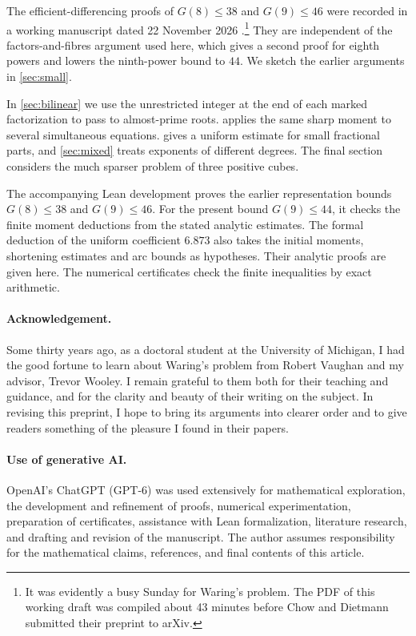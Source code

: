 \documentclass[11pt,letterpaper]{article}
\theoremstyle{definition}
\begin{document}
The efficient-differencing proofs of $G(8)\le38$ and $G(9)\le46$
were recorded in a working manuscript dated 22 November 2026 \cite{working}.\footnote{It
was evidently a busy Sunday for Waring's problem. The PDF of this working
draft was compiled about 43 minutes before Chow and Dietmann submitted
their preprint to arXiv.}
They are independent of the factors-and-fibres argument used here,
which gives a second proof for eighth powers and lowers the ninth-power
bound to $44$. We sketch the earlier arguments in \cref{sec:small}.

In \cref{sec:bilinear} we use the unrestricted integer at the end of each
marked factorization to pass to almost-prime roots. 
applies the same sharp moment to several simultaneous equations.
 gives a uniform estimate for small fractional parts, and \cref{sec:mixed} treats exponents of different degrees.
The final section considers the much sparser problem of three positive cubes.

The accompanying Lean development proves the earlier representation
bounds $G(8)\le38$ and $G(9)\le46$. For the present bound $G(9)\le44$,
it checks the finite moment deductions from the stated analytic
estimates. The formal deduction of the uniform coefficient $6.873$
also takes the initial moments, shortening estimates and arc bounds as
hypotheses. Their analytic proofs are given here. The numerical
certificates \cite{cert} check the finite inequalities by exact arithmetic.

\paragraph{Acknowledgement.}
Some thirty years ago, as a doctoral student at the University of Michigan,
I had the good fortune to learn about Waring's problem from Robert Vaughan
and my advisor, Trevor Wooley. I remain grateful to them both for their
teaching and guidance, and for the clarity and beauty of their writing
on the subject. In revising this preprint, I hope to bring its arguments
into clearer order and to give readers something of the pleasure I found
in their papers.

\paragraph{Use of generative AI.}
OpenAI's ChatGPT (GPT-6) was used extensively for mathematical exploration,
the development and refinement of proofs, numerical experimentation,
preparation of certificates, assistance with Lean formalization,
literature research, and drafting and revision of the manuscript.
The author assumes responsibility for the mathematical claims, references,
and final contents of this article.
\end{document}
